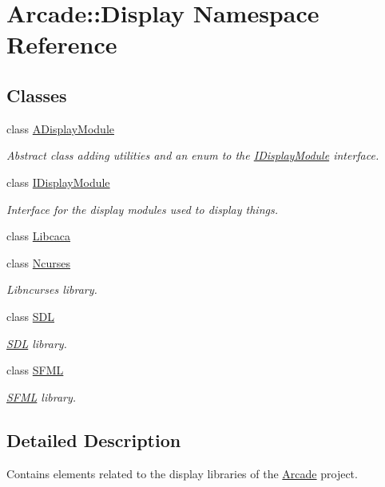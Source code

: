 \hypertarget{namespaceArcade_1_1Display}{}\section{Arcade\+::Display Namespace Reference}
\label{namespaceArcade_1_1Display}
\subsection*{Classes}
\begin{DoxyCompactItemize}
\item 
class \mbox{\hyperlink{classArcade_1_1Display_1_1ADisplayModule}{A\+Display\+Module}}
\begin{DoxyCompactList}\small\item\em Abstract class adding utilities and an enum to the \mbox{\hyperlink{classArcade_1_1Display_1_1IDisplayModule}{I\+Display\+Module}} interface. \end{DoxyCompactList}\item 
class \mbox{\hyperlink{classArcade_1_1Display_1_1IDisplayModule}{I\+Display\+Module}}
\begin{DoxyCompactList}\small\item\em Interface for the display modules used to display things. \end{DoxyCompactList}\item 
class \mbox{\hyperlink{classArcade_1_1Display_1_1Libcaca}{Libcaca}}
\item 
class \mbox{\hyperlink{classArcade_1_1Display_1_1Ncurses}{Ncurses}}
\begin{DoxyCompactList}\small\item\em Libncurses library. \end{DoxyCompactList}\item 
class \mbox{\hyperlink{classArcade_1_1Display_1_1SDL}{S\+DL}}
\begin{DoxyCompactList}\small\item\em \mbox{\hyperlink{classArcade_1_1Display_1_1SDL}{S\+DL}} library. \end{DoxyCompactList}\item 
class \mbox{\hyperlink{classArcade_1_1Display_1_1SFML}{S\+F\+ML}}
\begin{DoxyCompactList}\small\item\em \mbox{\hyperlink{classArcade_1_1Display_1_1SFML}{S\+F\+ML}} library. \end{DoxyCompactList}\end{DoxyCompactItemize}


\subsection{Detailed Description}
Contains elements related to the display libraries of the \mbox{\hyperlink{namespaceArcade}{Arcade}} project. 